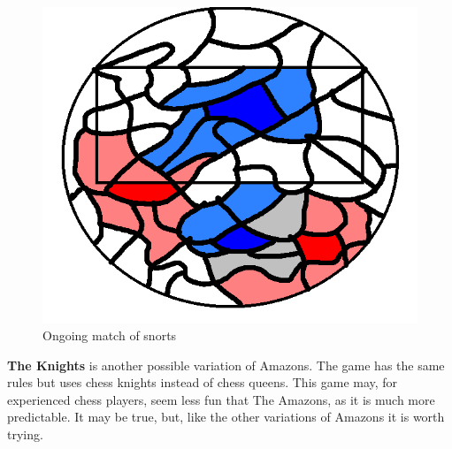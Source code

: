 \begin{figure} [H]
	\begin{center}
\includegraphics[scale=0.6]{sections/examples/snorts.png}
	\end{center}
\caption{Ongoing match of snorts}
\end{figure}

\textbf{The Knights} is another possible variation of Amazons. The game has the same rules but uses chess knights instead of chess queens. This game may, for experienced chess players, seem less fun that The Amazons, as it is much more predictable. It may be true, but, like the other variations of Amazons it is worth trying.















